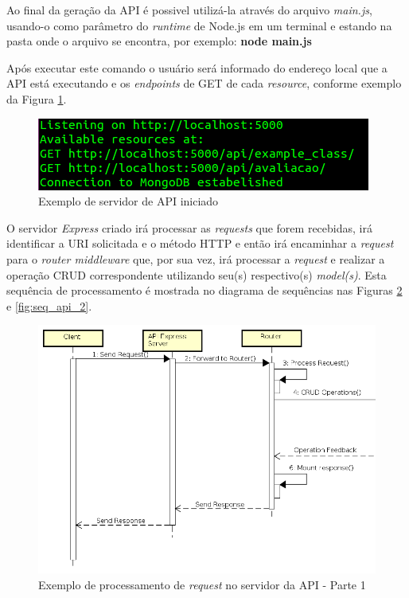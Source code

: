 Ao final da geração da API é possivel utilizá-la através do arquivo \textit{main.js}, usando-o como parâmetro do \textit{runtime} de Node.js em um terminal e estando na pasta onde o arquivo se encontra, por exemplo: \textbf{node main.js}

Após executar este comando o usuário será informado do endereço local que a API está executando e os \textit{endpoints} de GET de cada \textit{resource}, conforme exemplo da Figura \ref{fig:api_console}.

\begin{figure}
    \begin{center}
        \includegraphics[scale=0.7]{imagens/outApiConsole.png}
    \end{center}
	\caption{\label{fig:api_console}Exemplo de servidor de API iniciado}
\end{figure}

O servidor \textit{Express} criado irá processar as \textit{requests} que forem recebidas, irá identificar a URI solicitada e o método HTTP e então irá encaminhar a \textit{request} para o \textit{router middleware} que, por sua vez, irá processar a \textit{request} e realizar a operação CRUD correspondente utilizando seu(s) respectivo(s) \textit{model(s)}. Esta sequência de processamento é mostrada no diagrama de sequências nas Figuras \ref{fig:seq_api_1} e \ref{fig:seq_api_2}.


\begin{figure}
    \begin{center}
        \includegraphics[scale=0.7]{imagens/API_Sequence_Diagram_1.png}
    \end{center}
	\caption{\label{fig:seq_api_1}Exemplo de processamento de \textit{request} no servidor da API - Parte 1}
\end{figure}

